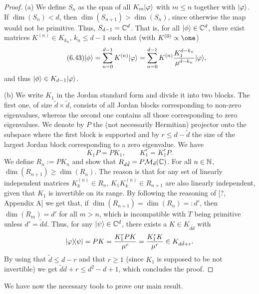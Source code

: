 \documentclass[11pt,a4paper]{article}
\theoremstyle{plain}
\theoremstyle{definition}
\theoremstyle{remark}
\begin{document}
\begin{proof}
    (a) We define $S_n$ as the span of all $K_m|\varphi\rangle$ with $m\le n$ together
    with $|\varphi\rangle$. If $\dim(S_n)<d$, then $\dim(S_{n+1})>\dim(S_n)$, since
    otherwise the map would not be primitive. Thus, $S_{d-1}=\mathbb{C}^d$. That is, for all
    $|\phi\rangle\in\mathbb{C}^d$, there exist matrices $K^{(n)}\in K_{k_n}$, $k_n\le d-1$ such
    that (with $K^{(0)}\propto \one$)
    \begin{equation}\tag{6.43}
        |\phi\rangle
        = \sum_{n=0}^{d-1} K^{(n)}|\varphi\rangle
        = \sum_{n=0}^{d-1} K^{(n)} \frac{K_1^{d-k_n}}{\mu^{d-k_n}}|\varphi\rangle,
    \end{equation}
    and thus $|\phi\rangle\in K_{d-1}|\varphi\rangle$.

    (b) We write $K_1$ in the Jordan standard form and divide it into two blocks. The
    first one, of size $\tilde d\times \tilde d$, consists of all Jordan blocks
    corresponding to non-zero eigenvalues, whereas the second one contains all those
    corresponding to zero eigenvalues. We denote by $P$ the (not necessarily
    Hermitian) projector onto the subspace where the first block is supported and by
    $r\le d-\tilde d$ the size of the largest Jordan block corresponding to a zero
    eigenvalue. We have
    \begin{equation}\tag{6.44}
        K_1P=PK_1,
        \qquad
        K_1^r = K_1^r P.
    \end{equation}
    We define $R_n:=PK_n$ and show that $R_{d\tilde d}=P\mathcal{M}_d(\mathbb{C})$. For all $n\in\mathbb{N}$,
    $\dim(R_{n+1})\ge \dim(R_n)$. The reason is that for any set of linearly
    independent matrices $K^{(n)}_k\in R_n$, $K_1K^{(n)}_k\in R_{n+1}$ are also linearly
    independent, given that $K_1$ is invertible on its range. By following the
    reasoning of [?, Appendix A] we get that, if $\dim(R_{n+1})=\dim(R_n)=:d'$, then
    $\dim(R_m)=d'$ for all $m>n$, which is incompatible with $T$ being primitive unless
    $d'=\tilde d d$. Thus, for any $|\psi\rangle\in\mathbb{C}^d$, there exists a $K\in K_{d\tilde d}$
    with
    \[
        |\varphi\rangle\!\langle\psi|
        = PK
        = \frac{K_1^r PK}{\mu^r}
        = \frac{K_1^r K}{\mu^r}
        \in K_{d\tilde d + r}.
    \]
    By using that $\tilde d\le d-r$ and that $r\ge 1$ (since $K_1$ is supposed to be
    not invertible) we get $\tilde d d + r \le d^2-d+1$, which concludes the proof.
\end{proof}

We have now the necessary tools to prove our main result.
\end{document}
